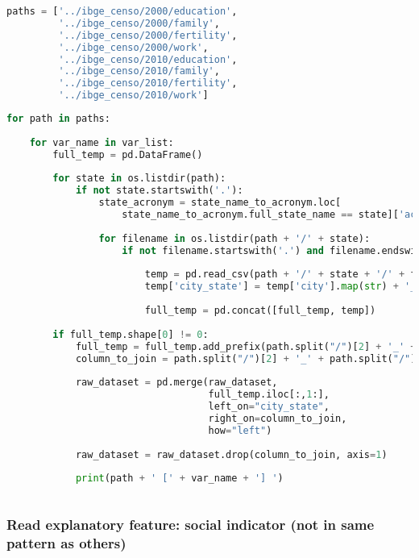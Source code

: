 \begin{lstlisting}[language=Python]
paths = ['../ibge_censo/2000/education',
         '../ibge_censo/2000/family',
         '../ibge_censo/2000/fertility',
         '../ibge_censo/2000/work',
         '../ibge_censo/2010/education',
         '../ibge_censo/2010/family',
         '../ibge_censo/2010/fertility',
         '../ibge_censo/2010/work']
\end{lstlisting}

\begin{lstlisting}[language=Python]
for path in paths:
    
    for var_name in var_list:
        full_temp = pd.DataFrame()
        
        for state in os.listdir(path):
            if not state.startswith('.'):
                state_acronym = state_name_to_acronym.loc[
                    state_name_to_acronym.full_state_name == state]['acronym'].values[0]
        
                for filename in os.listdir(path + '/' + state):
                    if not filename.startswith('.') and filename.endswith(var_name + '.csv'):
        
                        temp = pd.read_csv(path + '/' + state + '/' + filename)
                        temp['city_state'] = temp['city'].map(str) + '_' + state_acronym
                        
                        full_temp = pd.concat([full_temp, temp])
        
        if full_temp.shape[0] != 0:
            full_temp = full_temp.add_prefix(path.split("/")[2] + '_' + path.split("/")[3] + '_' + var_name + '_')
            column_to_join = path.split("/")[2] + '_' + path.split("/")[3] + '_' + var_name + '_city_state'
            
            raw_dataset = pd.merge(raw_dataset,
                                   full_temp.iloc[:,1:],
                                   left_on="city_state",
                                   right_on=column_to_join,
                                   how="left")
            
            raw_dataset = raw_dataset.drop(column_to_join, axis=1)
            
            print(path + ' [' + var_name + '] ')
        
\end{lstlisting}

\subsubsection{Read explanatory feature: social indicator (not in same
pattern as
others)}\label{read-explanatory-feature-social-indicator-not-in-same-pattern-as-others}

